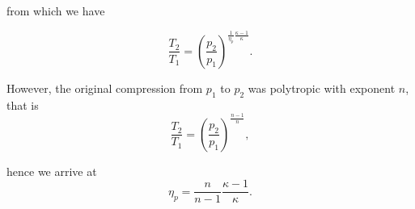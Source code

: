 from which we have

\begin{equation}
  \frac{T_2}{T_1}=\left( \frac{p_2}{p_1}\right)^{\frac{1}{\eta_p}\frac{\kappa-1}{\kappa}}.
\end{equation}

However, the original compression from $p_1$ to $p_2$ was polytropic with exponent $n$, that is
\begin{equation}
  \frac{T_2}{T_1}=\left( \frac{p_2}{p_1}\right)^{\frac{n-1}{n}},
\end{equation}

hence we arrive at
\begin{equation}
  \eta_p=\frac{n}{n-1}\frac{\kappa-1}{\kappa}.
\end{equation}





\clearpage

